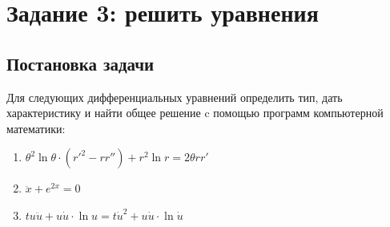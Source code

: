 \documentclass[14pt, titlepage, a4paper, fleqn]{extarticle}
\begin{document}
    \section{Задание 3: решить уравнения}
        \subsection{Постановка задачи}
            Для следующих дифференциальных уравнений определить тип, дать характеристику и найти общее решение c помощью программ компьютерной математики:

            \begin{enumerate}
                \item \(
                    \theta^2 \ln{\theta} \cdot (r'^2 - rr'') + r^2 \ln{r} = 2\theta rr'  
                \)

                \item \(\ddot{x} + e^{2x} = 0\)
                
                \item \(tu\ddot{u} + u\dot{u} \cdot \ln{u} = t\dot{u}^2 + u\dot{u} \cdot \ln{\dot{u}}\)
            \end{enumerate}
\end{document}
